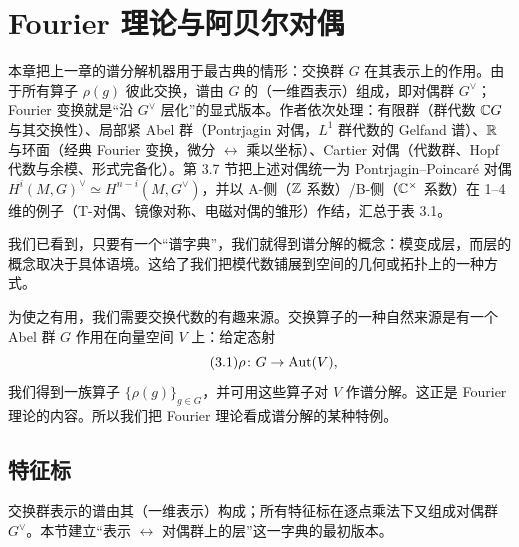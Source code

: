 \chapter{Fourier 理论与阿贝尔对偶}\label{ch:03}

\begin{keytakeaways}
本章把上一章的谱分解机器用于最古典的情形：交换群 $G$ 在其表示上的作用。由于所有算子 $\rho(g)$ 彼此交换，谱由 $G$ 的（一维酉表示）组成，即对偶群 $G^{\vee}$；Fourier 变换就是“沿 $G^{\vee}$ 层化”的显式版本。作者依次处理：有限群（群代数 $\mathbb{C} G$ 与其交换性）、局部紧 Abel 群（Pontrjagin 对偶，$L^1$ 群代数的 Gelfand 谱）、$\mathbb{R}$ 与环面（经典 Fourier 变换，微分 $\leftrightarrow$ 乘以坐标）、Cartier 对偶（代数群、Hopf 代数与余模、形式完备化）。第 3.7 节把上述对偶统一为 Pontrjagin--Poincaré 对偶 $H^i(M,G)^{\vee}\simeq H^{n-i}(M,G^{\vee})$，并以 A-侧（$\mathbb{Z}$ 系数）/B-侧（$\mathbb{C}^{\times}$ 系数）在 1--4 维的例子（T-对偶、镜像对称、电磁对偶的雏形）作结，汇总于表 3.1。
\end{keytakeaways}

我们已看到，只要有一个“谱字典”，我们就得到谱分解的概念：模变成层，而层的概念取决于具体语境。这给了我们把模代数铺展到空间的几何或拓扑上的一种方式。

为使之有用，我们需要交换代数的有趣来源。交换算子的一种自然来源是有一个 Abel 群 $G$ 作用在向量空间 $V$ 上：给定态射
\begin{equation}\tag{3.1}
\rho\colon G\to\mathrm{Aut}(V),
\end{equation}
我们得到一族算子 $\{\rho(g)\}_{g\in G}$，并可用这些算子对 $V$ 作谱分解。这正是 Fourier 理论的内容。所以我们把 Fourier 理论看成谱分解的某种特例。

\section{特征标}

\begin{sectionkey}
交换群表示的谱由其（一维表示）构成；所有特征标在逐点乘法下又组成对偶群 $G^{\vee}$。本节建立“表示 $\leftrightarrow$ 对偶群上的层”这一字典的最初版本。
\end{sectionkey}

